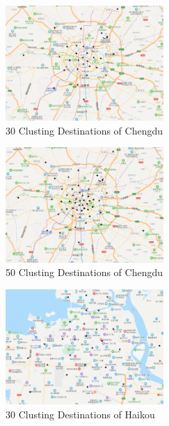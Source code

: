 \documentclass{llncs}
\begin{document}
\begin{figure}[htbp]
	\centering
	\begin{subfigure}[t]{0.45\textwidth}
		\begin{minipage}{6cm}
			\centering
			\includegraphics[width=6cm]{figures/chengdu_30.png}
			\caption{30 Clusting Destinations of Chengdu}
		\end{minipage}%
	\end{subfigure}
	\begin{subfigure}[t]{0.45\textwidth}
		\begin{minipage}{6cm}
			\centering
			\includegraphics[width=6cm]{figures/chengdu_50.png}
			\caption{50 Clusting Destinations of Chengdu}
		\end{minipage}
	\end{subfigure}
	\begin{subfigure}[t]{0.45\textwidth}
		\begin{minipage}{6cm}
			\centering
			\includegraphics[width=6cm]{figures/haikou_30.png}
			\caption{30 Clusting Destinations of Haikou}
		\end{minipage}%
	\end{subfigure}
	\begin{subfigure}[t]{0.45\textwidth}

\end{subfigure}
\end{figure}
\end{document}
